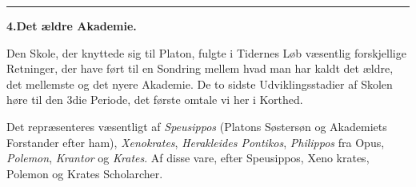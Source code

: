 \documentclass[12pt,a4paper]{book}
\newcommand{\divrule}{\begin{center}\rule{2cm}{0.4pt}\end{center}}
\begin{document}
\divrule
\begin{center}
\textbf{4.\enspace Det ældre Akademie.}
\end{center}
Den Skole, der knyttede sig til Platon, fulgte i Tidernes
Løb væsentlig forskjellige Retninger, der have ført til en
Sondring mellem hvad man har kaldt det ældre, det mellemste
og det nyere Akademie. De to sidste Udviklingsstadier af Skolen
høre til den 3die Periode, det første omtale vi her i Korthed.

Det repræsenteres væsentligt af \emph{Speusippos} (Platons
Søstersøn og Akademiets Forstander efter ham), \emph{Xenokrates},
\emph{Herakleides Pontikos}, \emph{Philippos} fra Opus, \emph{Polemon},
\emph{Krantor} og \emph{Krates}. Af disse vare, efter Speusippos, Xeno\-%
krates, Polemon og Krates Scholarcher.
\end{document}

